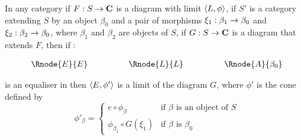 \documentclass[10pt,a4paper]{article}
\begin{document}
\begin{lemma}
In any category  if $F: S \rightarrow \textbf{C}$ is a diagram with limit $\left\langle L,\phi\right\rangle$,
if $S'$ is a category extending $S$ by an object $\beta_0$ and a pair of morphisms $\xi_1: \beta_1 \rightarrow \beta_0$ and $\xi_2: \beta_2 \rightarrow \beta_0$, where $\beta_1$ and $\beta_2$ are objects of $S$, if $G: S \rightarrow \textbf{C}$ is a diagram that extends $F$, then if :
\begin{center}
\begin{equation}
\label{equaliser}
\begin{array}{cp{1cm}cp{1cm} c}
\Rnode{E}{E}& &    \Rnode{L}{L}  & & \Rnode{A}{\beta_0} 
\end{array}
\end{equation}
\setlength{\arroffsetA}{3pt}
\setlength{\arroffsetB}{3pt}
\setlength{\arroffsetA}{-3pt}
\setlength{\arroffsetB}{-3pt}
\arreset
\end{center}
is an equaliser in  then $\left\langle E,\phi'\right\rangle$ is a limit of the diagram $G$, where
$\phi'$ is the cone defined by
\begin{equation*}
\phi'_\beta =
\left\{
	\begin{array}{ll}
		e \circ \phi_\beta           & \mbox{if } \beta \mbox{ is an object of } S  \\
		\phi_{\beta_1} \circ G(\xi_1) & \mbox{if } \beta \mbox{ is } \beta_0 
	\end{array}
\right.
\end{equation*}

\end{lemma}
\end{document}
